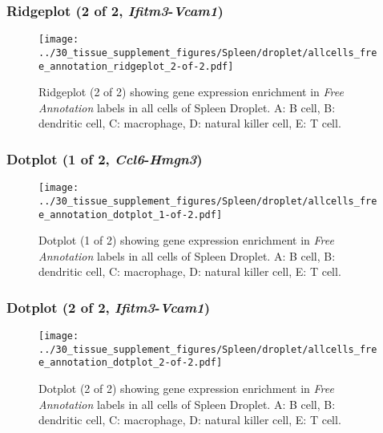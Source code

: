 \clearpage

\subsubsection{Ridgeplot (2 of 2, \emph{Ifitm3}-\emph{Vcam1})}
\begin{figure}[h]
\centering
\texttt{[image: ../30\_tissue\_supplement\_figures/Spleen/droplet/allcells\_free\_annotation\_ridgeplot\_2-of-2.pdf]}

\caption{ Ridgeplot (2 of 2)  showing gene expression enrichment in \emph{Free Annotation} labels in all cells of Spleen Droplet. A: B cell, B: dendritic cell, C: macrophage, D: natural killer cell, E: T cell.}
\end{figure}


\clearpage

\subsubsection{Dotplot (1 of 2, \emph{Ccl6}-\emph{Hmgn3})}
\begin{figure}[h]
\centering
\texttt{[image: ../30\_tissue\_supplement\_figures/Spleen/droplet/allcells\_free\_annotation\_dotplot\_1-of-2.pdf]}

\caption{ Dotplot (1 of 2)  showing gene expression enrichment in \emph{Free Annotation} labels in all cells of Spleen Droplet. A: B cell, B: dendritic cell, C: macrophage, D: natural killer cell, E: T cell.}
\end{figure}


\clearpage

\subsubsection{Dotplot (2 of 2, \emph{Ifitm3}-\emph{Vcam1})}
\begin{figure}[h]
\centering
\texttt{[image: ../30\_tissue\_supplement\_figures/Spleen/droplet/allcells\_free\_annotation\_dotplot\_2-of-2.pdf]}

\caption{ Dotplot (2 of 2)  showing gene expression enrichment in \emph{Free Annotation} labels in all cells of Spleen Droplet. A: B cell, B: dendritic cell, C: macrophage, D: natural killer cell, E: T cell.}
\end{figure}


